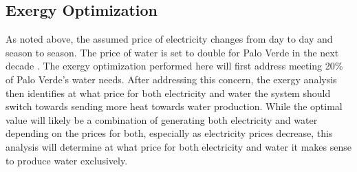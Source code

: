 \clearpage



\subsection{Exergy Optimization}
As noted above, the assumed price of electricity changes from day to day and season to season.  The price of water is set to double for Palo Verde in the next decade \cite{Brown2018}. The exergy optimization performed here will first address meeting 20\% of Palo Verde's water needs. After addressing this concern, the exergy analysis then identifies at what price for both electricity and water the system should switch towards sending more heat towards water production. While the optimal value will likely be a combination of generating both electricity and water depending on the prices for both, especially as electricity prices decrease, this analysis will determine at what price for both electricity and water it makes sense to produce water exclusively.

